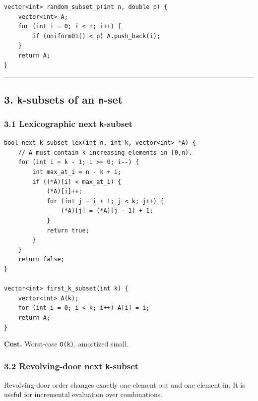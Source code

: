 \documentclass[11pt]{article}
\begin{document}
\begin{verbatim}
vector<int> random_subset_p(int n, double p) {
    vector<int> A;
    for (int i = 0; i < n; i++) {
        if (uniform01() < p) A.push_back(i);
    }
    return A;
}
\end{verbatim}

\begin{center}\rule{0.5\linewidth}{0.5pt}\end{center}

\subsection{\texorpdfstring{3. \texttt{k}-subsets of an \texttt{n}-set}{3. k-subsets of an n-set}}\label{k-subsets-of-an-n-set}

\subsubsection{\texorpdfstring{3.1 Lexicographic next \texttt{k}-subset}{3.1 Lexicographic next k-subset}}\label{lexicographic-next-k-subset}

\begin{verbatim}
bool next_k_subset_lex(int n, int k, vector<int> *A) {
    // A must contain k increasing elements in [0,n).
    for (int i = k - 1; i >= 0; i--) {
        int max_at_i = n - k + i;
        if ((*A)[i] < max_at_i) {
            (*A)[i]++;
            for (int j = i + 1; j < k; j++) {
                (*A)[j] = (*A)[j - 1] + 1;
            }
            return true;
        }
    }
    return false;
}

vector<int> first_k_subset(int k) {
    vector<int> A(k);
    for (int i = 0; i < k; i++) A[i] = i;
    return A;
}
\end{verbatim}

\textbf{Cost.} Worst-case \texttt{O(k)}, amortized small.

\subsubsection{\texorpdfstring{3.2 Revolving-door next \texttt{k}-subset}{3.2 Revolving-door next k-subset}}\label{revolving-door-next-k-subset}

Revolving-door order changes exactly one element out and one element in. It is useful for incremental evaluation over combinations.
\end{document}
